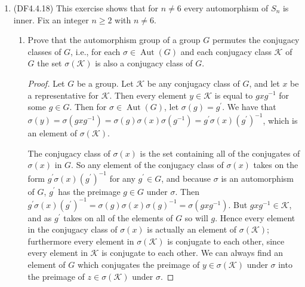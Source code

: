 \documentclass[11pt]{article}
\DeclareMathOperator\Aut{Aut}
\begin{document}
\begin{enumerate}
\begin{proof}
      This number is the index of the stabilizer of $P$ in $S_n$, under the action of conjugation by $S_p$. But the stabilizer of $P$ under conjugation is precisely the normalizer of $P$ in $S_p$, so we have that \[(p-2)! = \frac{\abs{S_p}}{\abs{N_{S_p}(P)}} = \frac{p!}{\abs{N_{S_p}(P)}},\] which implies that $\abs{N_{S_p}(P)} = p(p-1)$.
    \end{proof}
    \item (DF4.4.18) This exercise shows that for $n\neq 6$ every automorphism of $S_n$ is inner. Fix an integer $n\geq 2$ with $n\neq 6$.
    \begin{enumerate}[label=(\alph*)]
      \item Prove that the automorphism group of a group $G$ permutes the conjugacy classes of $G$, i.e., for each $\sigma\in \Aut(G)$ and each conjugacy class $\mathcal{K}$ of $G$ the set $\sigma(\mathcal{K})$ is also a conjugacy class of $G$.\
      \begin{proof}
        Let $G$ be a group. Let $\mathcal{K}$ be any conjugacy class of $G$, and let $x$ be a representative for $\mathcal{K}$. Then every element $y\in \mathcal{K}$ is equal to $gxg^{-1}$ for some $g\in G$. Then for $\sigma\in \Aut(G)$, let $\sigma(g) = g^{\prime}$. We have that $\sigma(y) = \sigma(gxg^{-1}) = \sigma(g)\sigma(x)\sigma(g^{-1}) = g^{\prime}\sigma(x)(g^{\prime})^{-1}$, which is an element of $\sigma(\mathcal{K})$.
        
        The conjugacy class of $\sigma(x)$ is the set containing all of the conjugates of $\sigma(x)$ in $G$. So any element of the conjugacy class of $\sigma(x)$ takes on the form $g^{\prime}\sigma(x)(g^{\prime})^{-1}$ for any $g^{\prime}\in G$, and because $\sigma$ is an automorphism of $G$, $g^{\prime}$ has the preimage $g\in G$ under $\sigma$. Then $g^{\prime}\sigma(x)(g^{\prime})^{-1} = \sigma(g)\sigma(x)\sigma(g)^{-1} = \sigma(gxg^{-1})$. But $gxg^{-1}\in \mathcal{K}$, and as $g^{\prime}$ takes on all of the elements of $G$ so will $g$. Hence every element in the conjugacy class of $\sigma(x)$ is actually an element of $\sigma(\mathcal{K})$; furthermore every element in $\sigma(\mathcal{K})$ is conjugate to each other, since every element in $\mathcal{K}$ is conjugate to each other. We can always find an element of $G$ which conjugates the preimage of $y\in \sigma(\mathcal{K})$ under $\sigma$ into the preimage of $z\in \sigma(\mathcal{K})$ under $\sigma$.


\end{proof}
\end{enumerate}
\end{enumerate}
\end{document}
